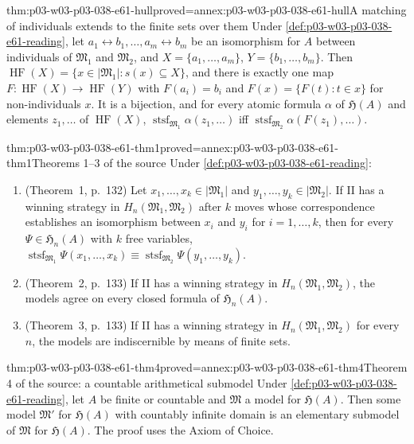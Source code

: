 \begin{hblemma}{thm:p03-w03-p03-038-e61-hull}{proved=annex:p03-w03-p03-038-e61-hull}{A matching of individuals extends to the finite sets over them}
Under \cref{def:p03-w03-p03-038-e61-reading}, let
\(a_1\leftrightarrow b_1,\ldots,a_m\leftrightarrow b_m\) be an isomorphism
for \(A\) between individuals of \(\mathfrak M_1\) and \(\mathfrak M_2\),
and \(X=\{a_1,\ldots,a_m\}\), \(Y=\{b_1,\ldots,b_m\}\). Then
\(\operatorname{HF}(X)=\{x\in|\mathfrak M_1|:s(x)\subseteq X\}\), and there
is exactly one map \(F:\operatorname{HF}(X)\to\operatorname{HF}(Y)\) with
\(F(a_i)=b_i\) and \(F(x)=\{F(t):t\in x\}\) for non-individuals \(x\). It is
a bijection, and for every atomic formula \(\alpha\) of \(\mathfrak H(A)\)
and elements \(z_1,\ldots\) of \(\operatorname{HF}(X)\),
\(\operatorname{stsf}_{\mathfrak M_1}\alpha(z_1,\ldots)\) iff
\(\operatorname{stsf}_{\mathfrak M_2}\alpha(F(z_1),\ldots)\).
\end{hblemma}

\begin{hbtheorem}{thm:p03-w03-p03-038-e61-thm1}{proved=annex:p03-w03-p03-038-e61-thm1}{Theorems 1--3 of the source}
Under \cref{def:p03-w03-p03-038-e61-reading}:
\begin{enumerate}
\item (Theorem~1, p.~132) Let \(x_1,\ldots,x_k\in|\mathfrak M_1|\) and
      \(y_1,\ldots,y_k\in|\mathfrak M_2|\). If II has a winning strategy in
      \(H_n(\mathfrak M_1,\mathfrak M_2)\) after \(k\) moves whose
      correspondence establishes an isomorphism between \(x_i\) and \(y_i\)
      for \(i=1,\ldots,k\), then for every \(\Psi\in\mathfrak H_n(A)\) with
      \(k\) free variables,
      \(\operatorname{stsf}_{\mathfrak M_1}\Psi(x_1,\ldots,x_k)\equiv
      \operatorname{stsf}_{\mathfrak M_2}\Psi(y_1,\ldots,y_k)\).
\item (Theorem~2, p.~133) If II has a winning strategy in
      \(H_n(\mathfrak M_1,\mathfrak M_2)\), the models agree on every closed
      formula of \(\mathfrak H_n(A)\).
\item (Theorem~3, p.~133) If II has a winning strategy in
      \(H_n(\mathfrak M_1,\mathfrak M_2)\) for every \(n\), the models are
      indiscernible by means of finite sets.
\end{enumerate}
\end{hbtheorem}

\begin{hbtheorem}{thm:p03-w03-p03-038-e61-thm4}{proved=annex:p03-w03-p03-038-e61-thm4}{Theorem 4 of the source: a countable arithmetical submodel}
Under \cref{def:p03-w03-p03-038-e61-reading}, let \(A\) be finite or
countable and \(\mathfrak M\) a model for \(\mathfrak H(A)\). Then some
model \(\mathfrak M'\) for \(\mathfrak H(A)\) with countably infinite domain
is an elementary submodel of \(\mathfrak M\) for \(\mathfrak H(A)\). The
proof uses the Axiom of Choice.
\end{hbtheorem}

